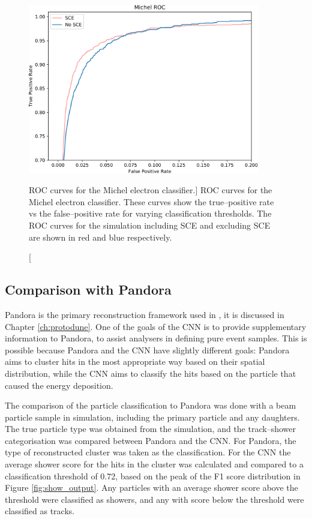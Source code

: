 \begin{figure}
	\centering
	\includegraphics[width=0.9\textwidth]{figures/michel_roc_comparison.pdf}
	\caption
	[ROC curves for the Michel electron classifier.]
	{ROC curves for the Michel electron classifier. These curves show
	the true--positive rate vs the false--positive rate for varying classification
	thresholds. The ROC curves for the \protodune{} simulation including SCE and
	excluding SCE are shown in red and blue respectively.}
	\label{fig:michel_roc}
\end{figure}

\subsection{Comparison with Pandora}
Pandora is the primary reconstruction framework used in \protodune{}, it is
discussed in Chapter \ref{ch:protodune}. One of the goals of the CNN is to
provide supplementary information to Pandora, to assist analysers in defining 
pure event samples. This is possible because Pandora and the CNN have slightly
different goals: Pandora aims to cluster hits in the most appropriate way based
on their spatial distribution, while the CNN aims to classify the hits based on 
the particle that caused the energy deposition.

The comparison of the particle classification to Pandora was done with a beam 
particle sample in \protodune{} simulation, including the primary particle and 
any daughters. The true particle type was obtained from the simulation, and 
the track--shower categorisation was compared between Pandora and the CNN. For 
Pandora, the type of reconstructed cluster was taken as the classification. 
For the CNN the average shower score for the hits in the cluster was 
calculated and compared to a classification threshold of 0.72, based on the 
peak of the F1 score distribution in Figure \ref{fig:show_output}. Any particles
with an average shower score above the threshold were classified as showers, 
and any with score below the threshold were classified as tracks. 

